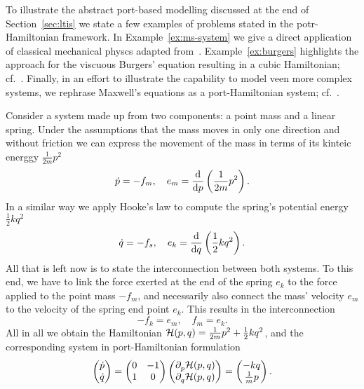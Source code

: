 To illustrate the abstract port-based modelling discussed at the end of Section~\ref{sec:ltis} we state a few examples of problems stated in the potr-Hamiltonian framework.
In Example~\ref{ex:ms-system} we give a direct application of classical mechanical physcs adapted from~\cite[Example~2.1]{VanDerSchaft2014}.
Example~\ref{ex:burgers} highlights the approach for the viscuous Burgers' equation resulting in a cubic Hamiltonian; cf.~\cite[Example~2.1]{Maschke2005}.
Finally, in an effort to illustrate the capability to model veen more complex systems, we rephrase Maxwell's equations as a port-Hamiltonian system; cf.~\cite[Section~2]{Haine2022}.


\begin{example}\label{ex:ms-system}
    Consider a system made up from two components: a point mass and a linear spring.
    Under the assumptions that the mass moves in only one direction and without friction we can express the movement of the mass in terms of its kinteic energgy $\frac{1}{2m} p^2$
    \begin{equation*}
        \dot{p} = -f_m,\quad e_m = \frac{\dif}{\dif p} \left( \frac{1}{2m} p^2 \right).
    \end{equation*}
    In a similar way we apply Hooke's law to compute the spring's potential energy $\frac{1}{2} k q^2$
    \begin{equation*}
        \dot{q} = -f_s,\quad e_k = \frac{\dif}{\dif q} \left( \frac{1}{2} k q^2 \right).
    \end{equation*}
    All that is left now is to state the interconnection between both systems.
    To this end, we have to link the force exerted at the end of the spring $e_k$ to the force applied to the point mass $-f_m$, and necessarily also connect the mass' velocity $e_m$ to the velocity of the spring end point $e_k$.
    This results in the interconnection
    \begin{equation*}
        -f_k = e_m,\quad f_m = e_k.
    \end{equation*}
    All in all we obtain the Hamiltonian $\mcl{H}(p, q) = \frac{1}{2m} p^2 + \frac{1}{2} k q^2$, and the corresponding system in port-Hamiltonian formulation
    \begin{equation*}
        \begin{pmatrix}
            \dot{p} \\
            \dot{q}
        \end{pmatrix} =
        \begin{pmatrix}
            0 & -1 \\
            1 & 0
        \end{pmatrix}
        \begin{pmatrix}
            \pd[p]{} \mcl{H}(p, q) \\
            \pd[q]{} \mcl{H}(p, q)
        \end{pmatrix} =
        \begin{pmatrix}
            -k q \\
            \frac{1}{m} p
        \end{pmatrix}.
    \end{equation*}


\end{example}
